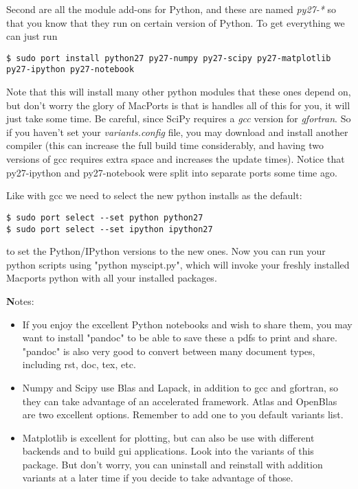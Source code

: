 \documentclass[11pt]{article}
\begin{document}
Second are all the module add-ons for Python, and these are named \textit{py27-*} so that you know that they run on certain version of Python. To get everything we can just run
\begin{lstlisting}[style=Bash]
$ sudo port install python27 py27-numpy py27-scipy py27-matplotlib py27-ipython py27-notebook
\end{lstlisting}
Note that this will install many other python modules that these ones depend on, but don't worry the glory of MacPorts is that is handles all of this for you, it will just take some time. Be careful, since SciPy requires a \textit{gcc} version for \textit{gfortran}. So if you haven't set your \textit{variants.config} file, you may download and install another compiler (this can increase the full build time considerably, and having two versions of gcc requires extra space and increases the update times). Notice that py27-ipython and py27-notebook were split into separate ports some time ago.

Like with gcc we need to select the new python installs as the default:
\begin{lstlisting}[style=Bash]
$ sudo port select --set python python27
$ sudo port select --set ipython ipython27
\end{lstlisting}
to set the Python/IPython versions to the new ones. Now you can run your python scripts using "python myscipt.py", which will invoke your freshly installed Macports python with all your installed packages.

{\textbf Notes:}
\begin{itemize}
	\item If you enjoy the excellent Python notebooks and wish to share them, you may want to install "pandoc" to be able to save these a pdfs to print and share. "pandoc" is also very good to convert between many document types, including rst, doc, tex, etc.
	\item Numpy and Scipy use Blas and Lapack, in addition to gcc and gfortran, so they can take advantage of an accelerated framework. Atlas and OpenBlas are two excellent options. Remember to add one to you default variants list.
	\item Matplotlib is excellent for plotting, but can also be use with different backends and to build gui applications. Look into the variants of this package. But don't worry, you can uninstall and reinstall with addition variants at a later time if you decide to take advantage of those.
\end{itemize}
\end{document}
